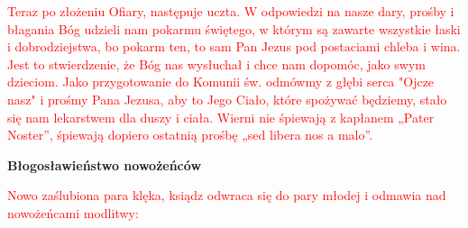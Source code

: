 \begin{center}
\textcolor{red}{Teraz po złożeniu Ofiary, następuje uczta. W odpowiedzi na nasze dary, prośby i błagania Bóg udzieli nam pokarmu świętego, w którym są zawarte wszystkie łaski i dobrodziejstwa, bo pokarm ten, to sam Pan Jezus pod postaciami chleba i wina. Jest to stwierdzenie, że Bóg nas wysłuchał i chce nam dopomóc, jako swym dzieciom. Jako przygotowanie do Komunii św. odmówmy z głębi serca "Ojcze nasz" i prośmy Pana Jezusa, aby to Jego Ciało, które spożywać będziemy, stało się nam lekarstwem dla duszy i ciała. Wierni nie śpiewają z kapłanem „Pater Noster”, śpiewają dopiero ostatnią prośbę „sed libera nos a malo”.}
\end{center}

\begin{Parallel}[v]{0.485\textwidth}{0.485\textwidth}

\end{Parallel}

\begin{center}
\textbf{Błogosławieństwo nowożeńców}
\end{center}

\begin{center}
\textcolor{red}{Nowo zaślubiona para klęka, ksiądz odwraca się do pary młodej i odmawia nad nowożeńcami modlitwy:}
\end{center}

